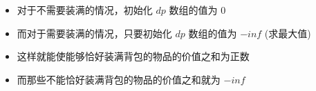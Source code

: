 \documentclass[E:/GsjzTle/main/main.tex]{subfiles}
\begin{document}
\begin{itemize}
\item
  对于不需要装满的情况，初始化 \(dp\) 数组的值为 \(0\)
\item
  而对于需要装满的情况，只要初始化 \(dp\) 数组的值为 \(-inf\) (求最大值)
\item
  这样就能使能够恰好装满背包的物品的价值之和为正数
\item
  而那些不能恰好装满背包的物品的价值之和就为 \(-inf\)
\end{itemize}
\end{document}
